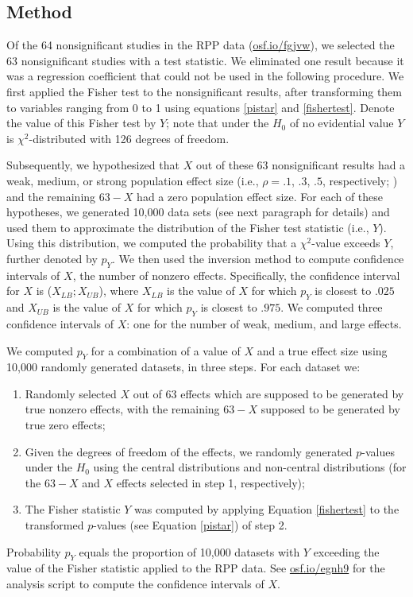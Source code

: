 \documentclass{article}
\begin{document}
\subsection*{Method}

Of the 64 nonsignificant studies in the RPP data (\url{osf.io/fgjvw}), we selected the 63 nonsignificant studies with a test statistic. We eliminated one result because it was a regression coefficient that could not be used in the following procedure. We first applied the Fisher test to the nonsignificant results, after transforming them to variables ranging from 0 to 1 using equations \ref{pistar} and \ref{fishertest}. Denote the value of this Fisher test by $Y$; note that under the $H_0$ of no evidential value $Y$ is $\chi^2$-distributed with 126 degrees of freedom.

Subsequently, we hypothesized that $X$ out of these 63 nonsignificant results had a weak, medium, or strong population effect size (i.e., $\rho=.1$, $.3$, $.5$, respectively; \cite{Cohen1988-wg}) and the remaining $63-X$ had a zero population effect size. For each of these hypotheses, we generated 10,000 data sets (see next paragraph for details) and used them to approximate the distribution of the Fisher test statistic (i.e., $Y$). Using this distribution, we computed the probability that a $\chi^2$-value exceeds $Y$, further denoted by $p_Y$. We then used the inversion method \cite{Casella2002-cy} to compute confidence intervals of $X$, the number of nonzero effects. Specifically, the confidence interval for $X$ is ($X_{LB};X_{UB}$), where $X_{LB}$ is the value of $X$ for which $p_Y$ is closest to $.025$ and $X_{UB}$ is the value of $X$ for which $p_Y$ is closest to $.975$. We computed three confidence intervals of $X$: one for the number of weak, medium, and large effects.

We computed $p_Y$ for a combination of a value of $X$ and a true effect size using 10,000 randomly generated datasets, in three steps. For each dataset we: 
 \begin{enumerate} 
\item Randomly selected $X$ out of 63 effects which are supposed to be generated by true nonzero effects, with the remaining $63-X$ supposed to be generated by true zero effects;
\item Given the degrees of freedom of the effects, we randomly generated $p$-values under the $H_0$ using the central distributions and non-central distributions (for the $63-X$ and $X$ effects selected in step 1, respectively);
\item The Fisher statistic $Y$ was computed by applying Equation \ref{fishertest} to the transformed $p$-values (see Equation \ref{pistar}) of step 2. 
 \end{enumerate} 
Probability $p_Y$ equals the proportion of 10,000 datasets with $Y$ exceeding the value of the Fisher statistic applied to the RPP data. See \url{osf.io/egnh9} for the analysis script to compute the confidence intervals of $X$. 
\end{document}
